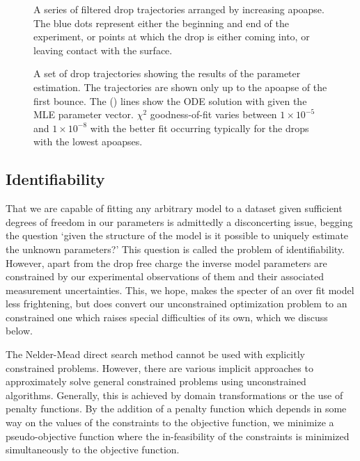 \documentclass[12pt,a4paper,oneside]{book}
\begin{document}
\begin{figure}[h]
    \centering
    \resizebox{\textwidth}{!}{}
    \caption{A series of filtered drop trajectories arranged by increasing apoapse. The blue dots represent either the beginning and end of the experiment, or points at which the drop is either coming into, or leaving contact with the surface.}
    \label{fig:trajectories}
\end{figure}
\begin{figure}[h]
    \centering
    \resizebox{\textwidth}{!}{}
    \caption{A set of drop trajectories showing the results of the parameter estimation. The trajectories are shown only up to the apoapse of the first bounce. The (\protect\redline) \hspace{0.25 mm} lines show the ODE solution with given the MLE parameter vector. $\chi^2$ goodness-of-fit varies between $1 \times 10^{-5}$ and $1 \times 10^{-8}$ with the better fit occurring typically for the drops with the lowest apoapses.}
    \label{fig:inverse_problem}
\end{figure}

\subsection{Identifiability}
That we are capable of fitting any arbitrary model to a dataset given sufficient degrees of freedom in our parameters is admittedly a disconcerting issue, begging the question `given the structure of the model is it possible to uniquely estimate the unknown parameters?' This question is called the problem of identifiability. However, apart from the drop free charge the inverse model parameters are constrained by our experimental observations of them and their associated measurement uncertainties. This, we hope, makes the specter of an over fit model less frightening, but does convert our unconstrained optimization problem to an constrained one which raises special difficulties of its own, which we discuss below. 

The Nelder-Mead direct search method cannot be used with explicitly constrained problems. However, there are various implicit approaches to approximately solve general constrained problems using unconstrained algorithms. Generally, this is achieved by domain transformations or the use of penalty functions.  By the addition of a penalty function which depends in some way on the values of the constraints to the objective function, we minimize a pseudo-objective function where the in-feasibility of the constraints is minimized simultaneously to the objective function. 
\end{document}
